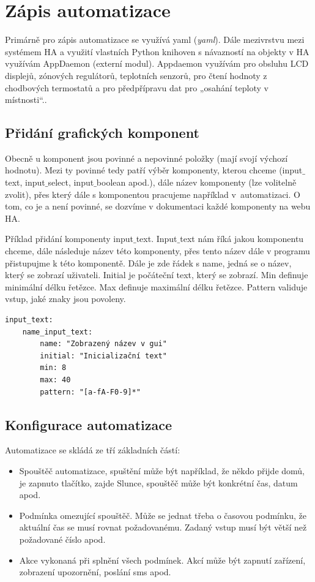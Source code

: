 \section{Zápis automatizace}
Primárně pro zápis automatizace se využívá \acrshort{yaml} (\textit{\acrlong{yaml}}). Dále mezivrstvu mezi systémem HA a využití vlastních Python knihoven s návazností na objekty v HA využívám AppDaemon (externí modul). Appdaemon využívám pro obsluhu LCD displejů, zónových regulátorů, teplotních senzorů, pro čtení hodnoty z chodbových termostatů a pro předpřípravu dat pro „osahání teploty v místnosti“.. 

\subsection{Přidání grafických komponent}
Obecně u komponent jsou povinné a nepovinné položky (mají svojí výchozí hodnotu). Mezi ty povinné tedy patří výběr komponenty, kterou chceme (input$\_$text, input$\_$select, input$\_$boolean apod.), dále název komponenty (lze volitelně zvolit), přes který dále s komponentou pracujeme například v~automatizaci. O tom, co je a není povinné, se dozvíme v dokumentaci každé komponenty na webu HA.

Příklad přidání komponenty input$\_$text. Input$\_$text nám říká jakou komponentu chceme, dále následuje název této komponenty, přes tento název dále v programu přistupujme k této komponentě. Dále je zde řádek s name,
jedná se o název, který se zobrazí uživateli. Initial je počáteční text, který se zobrazí. Min definuje minimální délku řetězce. Max definuje maximální délku řetězce. Pattern validuje vstup, jaké znaky jsou povoleny.

\begin{lstlisting}
input_text:
	name_input_text:
		name: "Zobrazený název v gui"
		initial: "Inicializační text"
		min: 8
		max: 40
		pattern: "[a-fA-F0-9]*"
\end{lstlisting}

\subsection{Konfigurace automatizace}

Automatizace se skládá ze tří základních částí:

\begin{itemize}
\item Spouštěč automatizace, spuštění může být například, že někdo přijde
domů, je zapnuto tlačítko, zajde Slunce, spouštěč může být konkrétní
čas, datum apod.
\item Podmínka omezující spouštěč. Může se jednat třeba o časovou podmínku, že aktuální čas se musí rovnat požadovanému. Zadaný vstup musí
být větší než požadované číslo apod.
\item Akce vykonaná při splnění všech podmínek. Akcí může být zapnutí
zařízení, zobrazení upozornění, poslání sms apod.
\end{itemize}

